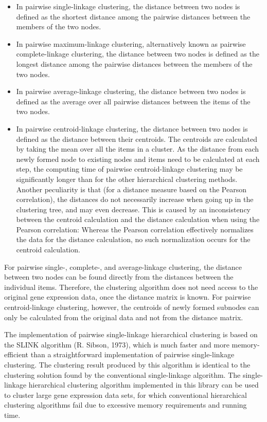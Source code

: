 \documentclass{report}
\begin{document}
\begin{itemize}
\item
In pairwise single-linkage clustering, the distance between two nodes is defined as the shortest distance among the pairwise distances between the members of the two nodes.
\item
In pairwise maximum-linkage clustering, alternatively known as pairwise complete-linkage clustering, the distance between two nodes is defined as the longest distance among the pairwise distances between the members of the two nodes.
\item
In pairwise average-linkage clustering, the distance between two nodes is defined as the average over all pairwise distances between the items of the two nodes.
\item
In pairwise centroid-linkage clustering, the distance between two nodes is defined as the distance between their centroids. The centroids are calculated by taking the mean over all the items in a cluster. As the distance from each newly formed node to existing nodes and items need to be calculated at each step, the computing time of pairwise centroid-linkage clustering may be significantly longer than for the other hierarchical clustering methods. Another peculiarity is that (for a distance measure based on the Pearson correlation), the distances do not necessarily increase when going up in the clustering tree, and may even decrease. This is caused by an inconsistency between the centroid calculation and the distance calculation when using the Pearson correlation: Whereas the Pearson correlation effectively normalizes the data for the distance calculation, no such normalization occurs for the centroid calculation.
\end{itemize}

For pairwise single-, complete-, and average-linkage clustering, the distance between two nodes can be found directly from the distances between the individual items. Therefore, the clustering algorithm does not need access to the original gene expression data, once the distance matrix is known. For pairwise centroid-linkage clustering, however, the centroids of newly formed subnodes can only be calculated from the original data and not from the distance matrix.

The implementation of pairwise single-linkage hierarchical clustering is based on the SLINK algorithm (R. Sibson, 1973), which is much faster and more memory-efficient than a straightforward implementation of pairwise single-linkage clustering. The clustering result produced by this algorithm is identical to the clustering solution found by the conventional single-linkage algorithm. The single-linkage hierarchical clustering algorithm implemented in this library can be used to cluster large gene expression data sets, for which conventional hierarchical clustering algorithms fail due to excessive memory requirements and running time.
\end{document}
